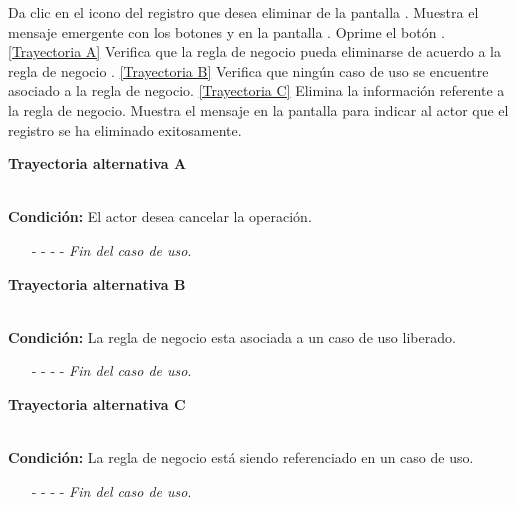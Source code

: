 	\begin{UCtrayectoria}
		\UCpaso[\UCactor] Da clic en el icono \eliminar del registro que desea eliminar de la pantalla .
		\UCpaso[\UCsist] Muestra el mensaje emergente  con los botones  y  en la pantalla .
		\UCpaso[\UCactor] Oprime el botón . \hyperlink{CU8-3:TAA}{[Trayectoria A]}
		\UCpaso[\UCsist] Verifica que la regla de negocio pueda eliminarse de acuerdo a la regla de negocio . \hyperlink{CU8-3:TAB}{[Trayectoria B]}
		\UCpaso[\UCsist] Verifica que ningún caso de uso se encuentre asociado a la regla de negocio. \hyperlink{CU8-3:TAC}{[Trayectoria C]}
		\UCpaso[\UCsist] Elimina la información referente a la regla de negocio.
		\UCpaso[\UCsist] Muestra el mensaje  en la pantalla  para indicar al actor que el registro se ha eliminado exitosamente.
	\end{UCtrayectoria}	

\hypertarget{CU8-3:TAA}{\textbf{Trayectoria alternativa A}}\\
\noindent \textbf{Condición:} El actor desea cancelar la operación.
\begin{enumerate}
	\UCpaso[\UCactor] Solicita cancelar la operación oprimiendo el botón  del mensaje emergente .
	\UCpaso[\UCsist] Muestra la pantalla .
	\item[- -] - - {\em {Fin del caso de uso}}.%
\end{enumerate}	
\hypertarget{CU8-3:TAB}{\textbf{Trayectoria alternativa B}}\\
\noindent \textbf{Condición:} La regla de negocio esta asociada a un caso de uso liberado.
\begin{enumerate}
\UCpaso[\UCsist] Oculta el botón \eliminar de la regla de negocio que esta asociada a casos de uso liberados de la pantalla .
	\item[- -] - - {\em {Fin del caso de uso}}.%
\end{enumerate}
\hypertarget{CU8-3:TAC}{\textbf{Trayectoria alternativa C}}\\
\noindent \textbf{Condición:} La regla de negocio está siendo referenciado en un caso de uso.
\begin{enumerate}
	\UCpaso[\UCsist] Muestra el mensaje  en la pantalla  en una pantalla emergente con la lista de casos de uso que están referenciando a la entidad.
	\item[- -] - - {\em {Fin del caso de uso}}.%
\end{enumerate}
	

